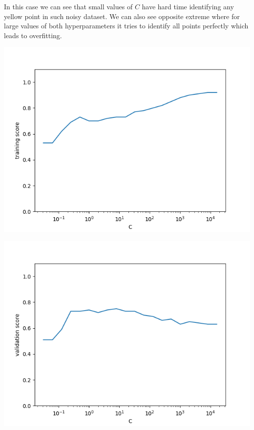 \documentclass[a4paper]{article}
\begin{document}
	In this case we can see that small values of $C$ have hard time identifying any yellow point in such noisy dataset. We can also see opposite extreme where for large values of both hyperparameters it tries to identify all points perfectly which leads to overfitting.  
	
	\centerline{\includegraphics[width=1\textwidth]{dataset_2_train_C_scores}}  
	
	\centerline{\includegraphics[width=1\textwidth]{dataset_2_validation_C_scores}}  
	
\end{document}
